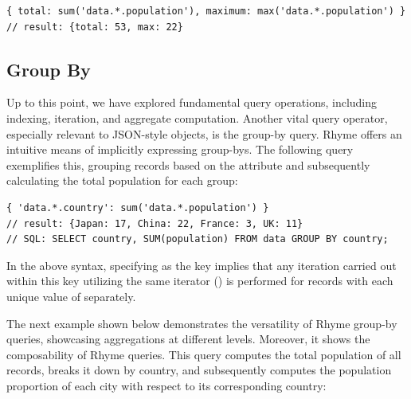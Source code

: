 \documentclass[runningheads]{llncs}
\newcommand{\lang}{Rhyme}
\begin{document}
\begin{lstlisting}[style=JavaScript, columns=flexible, numbers=none]
{ total: sum('data.*.population'), maximum: max('data.*.population') }
// result: {total: 53, max: 22}
\end{lstlisting}




\subsection{Group By}\label{subsec:groupby}
Up to this point, we have explored fundamental query operations, including indexing,
iteration, and aggregate computation.
Another vital query operator, especially relevant to JSON-style objects,
is the group-by query.
\lang{} offers an intuitive means of implicitly expressing group-bys.
The following query exemplifies this, grouping records based on the
 attribute and subsequently calculating the total population
for each group:

\begin{lstlisting}[style=JavaScript, columns=flexible, numbers=none]
{ 'data.*.country': sum('data.*.population') }
// result: {Japan: 17, China: 22, France: 3, UK: 11}
// SQL: SELECT country, SUM(population) FROM data GROUP BY country;
\end{lstlisting}

In the above syntax, specifying  as the key implies
that any iteration carried out within this key utilizing the same
iterator (\inline{*}) is performed for records with each unique value of 
separately.

The next example shown below demonstrates the versatility of \lang{} group-by queries, showcasing
aggregations at different levels.
Moreover, it shows the composability of \lang{} queries.
This query computes the total population of all records, breaks it down by country,
and subsequently computes the population proportion of each city with respect to its
corresponding country:
\end{document}
